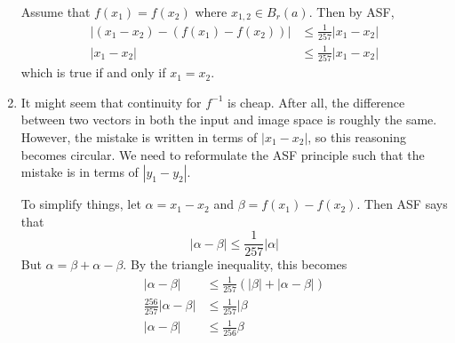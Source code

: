 \documentclass{article}
\numberwithin{equation}{section}
\begin{document}
\begin{enumerate}
          Assume that $f(x_1)=f(x_2)$ where $x_{1,2} \in B_r(a).$ Then by ASF,
          \begin{align}
              |(x_1-x_2)-(f(x_1)-f(x_2))| & \le \frac{1}{257}|x_1-x_2| \\
              |x_1-x_2|                   & \le \frac{1}{257}|x_1-x_2|
          \end{align}
          which is true if and only if $x_1=x_2.$

    \item It might seem that continuity for $f^{-1}$ is cheap. After all, the difference between two vectors in both the input and image space is roughly the same. However, the mistake is written in terms of $|x_1-x_2|$, so this reasoning becomes circular. We need to reformulate the ASF principle such that the mistake is in terms of $|y_1-y_2|.$

          To simplify things, let $\alpha=x_1-x_2$ and $\beta=f(x_1)-f(x_2).$ Then ASF says that
          \begin{equation}
              |\alpha-\beta | \le \frac{1}{257}|\alpha|
          \end{equation}
          But $\alpha = \beta + \alpha - \beta$. By the triangle inequality, this becomes
          \begin{align}
              |\alpha-\beta |               & \le \frac{1}{257}(|\beta|+|\alpha-\beta|) \\
              \frac{256}{257}|\alpha-\beta| & \le \frac{1}{257}|\beta                   \\
              |\alpha-\beta|                & \le \frac{1}{256}\beta
          \end{align}


\end{enumerate}
\end{document}

